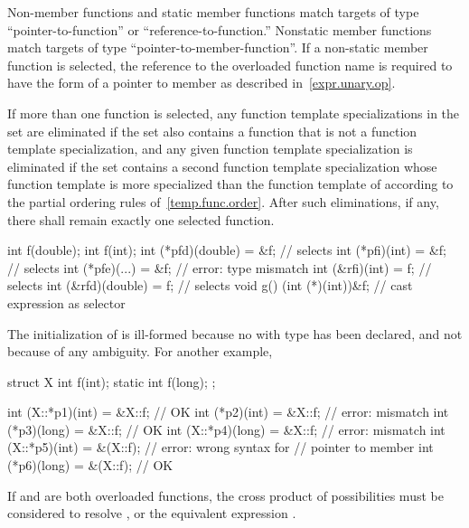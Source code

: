 \pnum
Non-member functions and static member functions
match targets of type ``pointer-to-function'' or
``reference-to-function.''
Nonstatic member functions match targets of
type ``pointer-to-member-function''.
If a non-static member function is selected, the reference to the overloaded
function name is required to have the form of a pointer to member as
described in~\ref{expr.unary.op}.

\pnum
If more than one function is selected, any
function template specializations
in the set
are eliminated if the set also contains a function that is not a
function template specialization, and
any given
function template specialization
is eliminated if the set contains a second
function template specialization whose function template
is more specialized than the
function template of
according to
the partial ordering rules of~\ref{temp.func.order}.
After such eliminations,
if any, there shall remain exactly one selected function.

\pnum
\enterexample
\begin{codeblock}
int f(double);
int f(int);
int (*pfd)(double) = &f;        // selects 
int (*pfi)(int) = &f;           // selects 
int (*pfe)(...) = &f;           // error: type mismatch
int (&rfi)(int) = f;            // selects 
int (&rfd)(double) = f;         // selects 
void g() {
  (int (*)(int))&f;             // cast expression as selector
}
\end{codeblock}

The initialization of
is ill-formed because no
with type
has been declared, and not because of any ambiguity.
For another example,

\begin{codeblock}
struct X {
  int f(int);
  static int f(long);
};

int (X::*p1)(int)  = &X::f;     // OK
int    (*p2)(int)  = &X::f;     // error: mismatch
int    (*p3)(long) = &X::f;     // OK
int (X::*p4)(long) = &X::f;     // error: mismatch
int (X::*p5)(int)  = &(X::f);   // error: wrong syntax for
                                // pointer to member
int    (*p6)(long) = &(X::f);   // OK
\end{codeblock}
\exitexample

\pnum
\enternote
If
and
are both overloaded functions, the
cross product of possibilities must be considered
to resolve
,
or the equivalent expression
.
\exitnote

